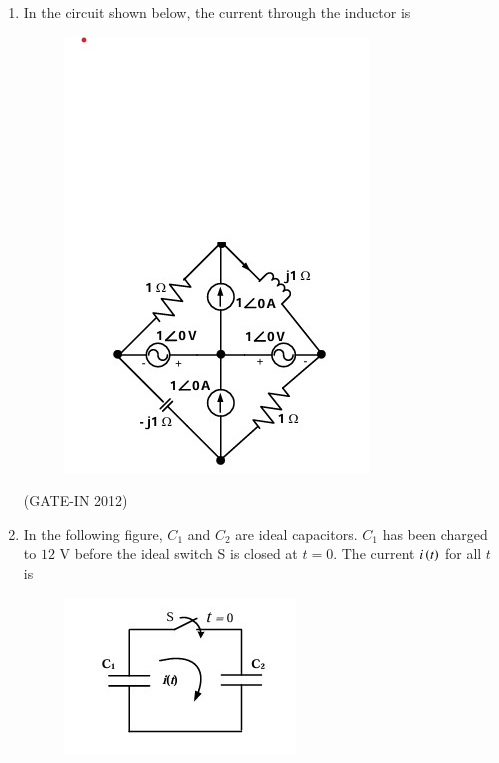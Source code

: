 \documentclass[journal,12pt,onecolumn]{IEEEtran}
\theoremstyle{remark}
\begin{document}
\begin{enumerate}
\item In the circuit shown below, the current through the inductor is
\begin{figure}[H]
    \centering
    \includegraphics[width=0.6\columnwidth]{figs/a1.jpg}
    \caption*{}
    \label{fig:a1}
\end{figure}

\hfill{(GATE-IN 2012)}
\begin{enumerate}
\end{enumerate}

\item In the following figure, $C_1$ and $C_2$ are ideal capacitors. $C_1$ has been charged to $12$ V before the ideal switch S is closed at $t=0$. The current $i\left(t\right)$ for all $t$ is
\begin{figure}[H]
    \centering
    \includegraphics[width=0.5\columnwidth]{figs/a2.jpg}
    \caption*{}
    \label{fig:a2}
\end{figure}


\end{enumerate}
\end{document}

